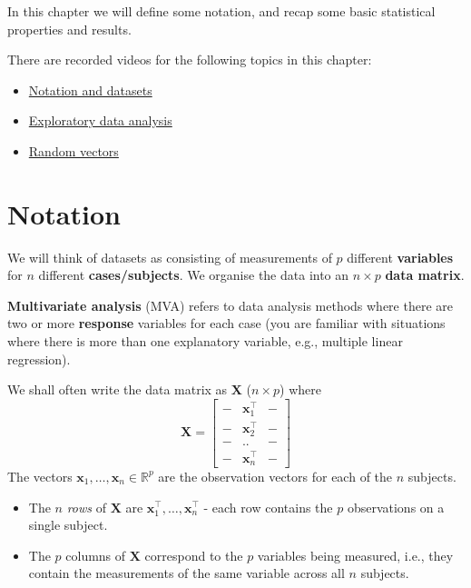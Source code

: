 \documentclass[
]{book}
\providecommand{\tightlist}{%
  \setlength{\itemsep}{0pt}\setlength{\parskip}{0pt}}
\theoremstyle{definition}
\theoremstyle{definition}
\theoremstyle{definition}
\theoremstyle{definition}
\theoremstyle{remark}
\begin{document}
In this chapter we will define some notation, and recap some basic statistical properties and results.

There are recorded videos for the following topics in this chapter:

\begin{itemize}
\tightlist
\item
  \href{https://mediaspace.nottingham.ac.uk/media/Notation+and+Datasets/1_p2nas9i4}{Notation and datasets}
\item
  \href{https://mediaspace.nottingham.ac.uk/media/Exploratory+data+analysis/1_seh9o28a}{Exploratory data analysis}
\item
  \href{https://mediaspace.nottingham.ac.uk/media/Random+Vectors/1_fpq4r9wh}{Random vectors}
\end{itemize}

\hypertarget{notation}{%
\section{Notation}\label{notation}}

We will think of datasets as consisting of measurements of \(p\) different \textbf{variables} for \(n\) different \textbf{cases/subjects}. We organise the data into an \(n \times p\) \textbf{data matrix}.

\textbf{Multivariate analysis} (MVA) refers to data analysis methods where there are two or more \textbf{response} variables for each case (you are familiar with situations where there is more than one explanatory variable, e.g., multiple linear regression).

We shall often write the data matrix as \(\mathbf X\) (\(n \times p\)) where
\[
{\mathbf X}=\left[ \begin{array}{ccc}
- &\mathbf x_1^\top&-\\
- &\mathbf x_2^\top&-\\
- &..&-\\
- &\mathbf x_n^\top&-
\end{array}\right ]
\]
The vectors \(\mathbf x_1, \ldots , \mathbf x_n \in \mathbb{R}^p\) are the observation vectors for each of the \(n\) subjects.

\begin{itemize}
\tightlist
\item
  The \(n\) \emph{rows} of \(\mathbf X\) are \(\mathbf x_1^\top, \ldots , \mathbf x_n^\top\) - each row contains the \(p\) observations on a single subject.
\item
  The \(p\) columns of \(\mathbf X\) correspond to the \(p\) variables being measured, i.e., they contain the measurements of the same variable across all \(n\) subjects.
\end{itemize}
\end{document}

